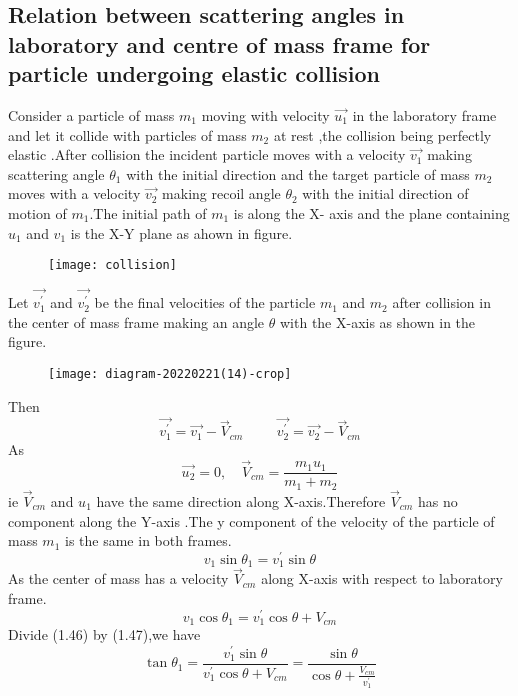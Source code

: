  \subsection{Relation between scattering angles in laboratory and centre of mass frame for particle undergoing elastic collision}
 Consider a particle of mass $m_1$ moving with velocity $\vec{u_1}$ in the laboratory frame and let it collide with particles of mass $m_2$ at rest ,the collision being perfectly elastic .After collision the incident particle moves with a velocity $\vec{v_1}$ making scattering angle $\theta_{1}$ with the initial direction and the target particle of mass $m_2$ moves with a velocity $\vec{v_2}$ making recoil angle $\theta_{2}$ with the initial direction of motion of $m_1$.The initial path of $m_1$ is along the X- axis and the plane containing $u_1$ and $v_1$ is the X-Y plane as ahown in figure.\\
 \begin{figure}[H]
 	\centering
 	\texttt{[image: collision]}
 	\caption{}
 	\label{}
 \end{figure}
 Let $\vec{v_1^{\prime}}$ and $\vec{v_2^{\prime}}$ be the final velocities of the particle $m_1$ and $m_2$ after collision in the center of mass frame making an angle $\theta$ with the X-axis as shown in the figure.
 \begin{figure}[H]
 	\centering
 	\texttt{[image: diagram-20220221(14)-crop]}
 	\caption{}
 	\label{}
 \end{figure}
 Then\\
 $$\vec{v_1^{\prime}}=\vec{v_1}-\vec{V}_{cm} \hspace{1cm} \vec{v_2^{\prime}}=\vec{v_2}-\vec{V}_{cm}$$
As $$\vec{u_2}=0 ,\quad \vec{V}_{cm}=\frac{m_1u_1}{m_1+m_2}$$
ie $\vec{V}_{cm}$ and $u_1$ have the same direction along X-axis.Therefore $\vec{V}_{cm}$ has no component along the Y-axis .The y component of the velocity of the particle of mass $m_1$ is the same in both frames.
\begin{equation}
v_1\sin\theta_1=v_1^{\prime}\sin\theta
\end{equation}
As the center of mass has a velocity $\vec{V}_{cm}$ along X-axis with respect to laboratory frame.
\begin{equation}
v_1\cos \theta_{1}=v_1^{\prime}\cos\theta +V_{cm}
\end{equation}
 Divide (1.46) by (1.47),we have \\
 $$\tan\theta_{1}=\frac{v_1^{\prime}\sin\theta}{v_1^{\prime}\cos\theta +V_{cm}}=\frac{\sin\theta}{\cos \theta +\frac{V_{cm}}{v_1^{\prime}}}$$

